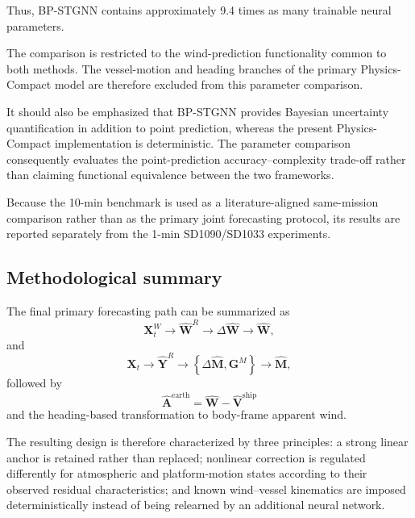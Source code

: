 Thus, BP-STGNN contains approximately 9.4 times as many trainable neural parameters.

The comparison is restricted to the wind-prediction functionality common to both methods. The vessel-motion and heading branches of the primary Physics-Compact model are therefore excluded from this parameter comparison.

It should also be emphasized that BP-STGNN provides Bayesian uncertainty quantification in addition to point prediction, whereas the present Physics-Compact implementation is deterministic. The parameter comparison consequently evaluates the point-prediction accuracy--complexity trade-off rather than claiming functional equivalence between the two frameworks.

Because the 10-min benchmark is used as a literature-aligned same-mission comparison rather than as the primary joint forecasting protocol, its results are reported separately from the 1-min SD1090/SD1033 experiments.

\subsection{Methodological summary}
\label{subsec:method_summary}

The final primary forecasting path can be summarized as
\begin{equation}
\mathbf X_t^{W}
\rightarrow
\hat{\mathbf W}^{R}
\rightarrow
\Delta\hat{\mathbf W}
\rightarrow
\hat{\mathbf W},
\label{eq:summary_wind}
\end{equation}
and
\begin{equation}
\mathbf X_t
\rightarrow
\hat{\mathbf Y}^{R}
\rightarrow
\left\{
\Delta\hat{\mathbf M},
\mathbf G^M
\right\}
\rightarrow
\hat{\mathbf M},
\label{eq:summary_motion}
\end{equation}
followed by
\begin{equation}
\boxed{
\hat{\mathbf A}^{\mathrm{earth}}
=
\hat{\mathbf W}
-
\hat{\mathbf V}^{\mathrm{ship}}
}
\label{eq:summary_apparent}
\end{equation}
and the heading-based transformation to body-frame apparent wind.

The resulting design is therefore characterized by three principles: a strong linear anchor is retained rather than replaced; nonlinear correction is regulated differently for atmospheric and platform-motion states according to their observed residual characteristics; and known wind--vessel kinematics are imposed deterministically instead of being relearned by an additional neural network.
